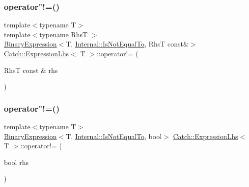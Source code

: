 \subsubsection{\texorpdfstring{operator"!=()}{operator!=()}\hspace{0.1cm}{\footnotesize\ttfamily [1/2]}}
{\footnotesize\ttfamily template$<$typename T$>$ \\
template$<$typename RhsT $>$ \\
\mbox{\hyperlink{class_catch_1_1_binary_expression}{Binary\+Expression}}$<$T, \mbox{\hyperlink{namespace_catch_1_1_internal_ae3f96598a7858155750bf38e7295d83ea1e1699cf7d3dbee0908f1a123da2456d}{Internal\+::\+Is\+Not\+Equal\+To}}, RhsT const\&$>$ \mbox{\hyperlink{class_catch_1_1_expression_lhs}{Catch\+::\+Expression\+Lhs}}$<$ T $>$\+::operator!= (\begin{DoxyParamCaption}\item[{RhsT const \&}]{rhs }\end{DoxyParamCaption})\hspace{0.3cm}{\ttfamily [inline]}}

\mbox{\label{class_catch_1_1_expression_lhs_a1f3ff934880623f12a4cbd9725397ccf}} 
\subsubsection{\texorpdfstring{operator"!=()}{operator!=()}\hspace{0.1cm}{\footnotesize\ttfamily [2/2]}}
{\footnotesize\ttfamily template$<$typename T$>$ \\
\mbox{\hyperlink{class_catch_1_1_binary_expression}{Binary\+Expression}}$<$T, \mbox{\hyperlink{namespace_catch_1_1_internal_ae3f96598a7858155750bf38e7295d83ea1e1699cf7d3dbee0908f1a123da2456d}{Internal\+::\+Is\+Not\+Equal\+To}}, bool$>$ \mbox{\hyperlink{class_catch_1_1_expression_lhs}{Catch\+::\+Expression\+Lhs}}$<$ T $>$\+::operator!= (\begin{DoxyParamCaption}\item[{bool}]{rhs }\end{DoxyParamCaption})\hspace{0.3cm}{\ttfamily [inline]}}

\mbox{\label{class_catch_1_1_expression_lhs_a919c48e52ff1be5f7329920d4da8e92f}} 
